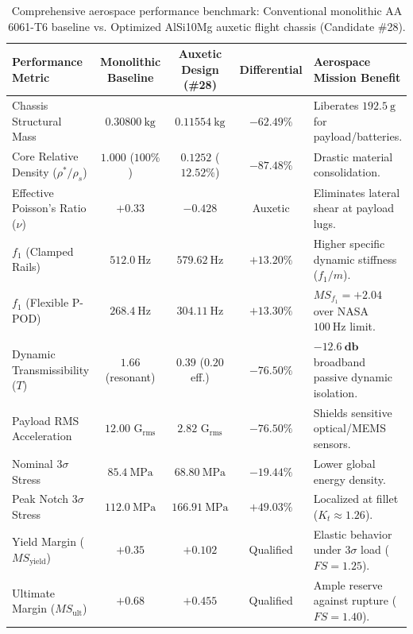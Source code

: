 \begin{table}[htbp]
\centering
\caption{Comprehensive aerospace performance benchmark: Conventional monolithic AA 6061-T6 baseline vs. Optimized AlSi10Mg auxetic flight chassis (Candidate \#28).}
\label{tab:flight_benchmark}
\scriptsize
\setlength{\tabcolsep}{3.5pt}
\begin{tabularx}{\textwidth}{l c c c >{\raggedright\arraybackslash}X}
\toprule
\textbf{Performance Metric} & \textbf{Monolithic Baseline} & \textbf{Auxetic Design (\#28)} & \textbf{Differential} & \textbf{Aerospace Mission Benefit} \\
\midrule
Chassis Structural Mass & $\SI{0.30800}{\kilo\gram}$ & $\SI{0.11554}{\kilo\gram}$ & $\mathbf{-62.49\%}$ & Liberates $\SI{192.5}{\gram}$ for payload/batteries. \\
Core Relative Density ($\rho^*/\rho_s$) & $1.000$ ($100\%$) & $0.1252$ ($12.52\%$) & $-87.48\%$ & Drastic material consolidation. \\
Effective Poisson's Ratio ($\nu$) & $+0.33$ & $-0.428$ & Auxetic & Eliminates lateral shear at payload lugs. \\
$f_1$ (Clamped Rails) & $\SI{512.0}{\hertz}$ & $\SI{579.62}{\hertz}$ & $\mathbf{+13.20\%}$ & Higher specific dynamic stiffness ($f_1/m$). \\
$f_1$ (Flexible P-POD) & $\SI{268.4}{\hertz}$ & $\SI{304.11}{\hertz}$ & $\mathbf{+13.30\%}$ & $MS_{f_1} = +2.04$ over NASA $\SI{100}{\hertz}$ limit. \\
Dynamic Transmissibility ($T$) & $1.66$ (resonant) & $0.39$ ($0.20$ eff.) & $\mathbf{-76.50\%}$ & $\mathbf{-12.6\ \si{\decibel}}$ broadband passive dynamic isolation. \\
Payload RMS Acceleration & $12.00\text{ G}_{\text{rms}}$ & $2.82\text{ G}_{\text{rms}}$ & $\mathbf{-76.50\%}$ & Shields sensitive optical/MEMS sensors. \\
Nominal $3\sigma$ Stress & $\SI{85.4}{\mega\pascal}$ & $\SI{68.80}{\mega\pascal}$ & $-19.44\%$ & Lower global energy density. \\
Peak Notch $3\sigma$ Stress & $\SI{112.0}{\mega\pascal}$ & $\SI{166.91}{\mega\pascal}$ & $+49.03\%$ & Localized at fillet ($K_t \approx 1.26$). \\
Yield Margin ($MS_{\text{yield}}$) & $+0.35$ & $\mathbf{+0.102}$ & Qualified & Elastic behavior under $3\sigma$ load ($FS=1.25$). \\
Ultimate Margin ($MS_{\text{ult}}$) & $+0.68$ & $\mathbf{+0.455}$ & Qualified & Ample reserve against rupture ($FS=1.40$). \\

\end{tabularx}
\end{table}
